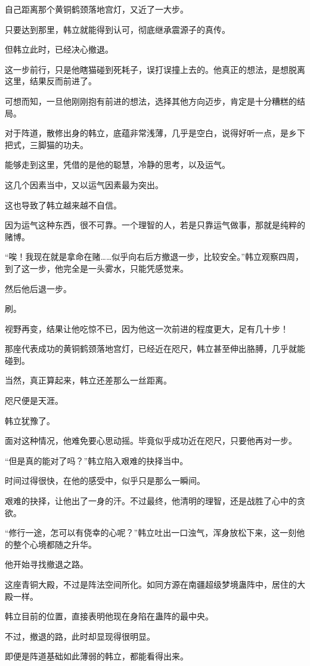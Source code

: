 \begin{this_body}
自己距离那个黄铜鹤颈落地宫灯，又近了一大步。

只要达到那里，韩立就能得到认可，彻底继承震源子的真传。

但韩立此时，已经决心撤退。

这一步前行，只是他瞎猫碰到死耗子，误打误撞上去的。他真正的想法，是想脱离这里，结果反而前进了。

可想而知，一旦他刚刚抱有前进的想法，选择其他方向迈步，肯定是十分糟糕的结局。

对于阵道，散修出身的韩立，底蕴非常浅薄，几乎是空白，说得好听一点，是乡下把式，三脚猫的功夫。

能够走到这里，凭借的是他的聪慧，冷静的思考，以及运气。

这几个因素当中，又以运气因素最为突出。

这也导致了韩立越来越不自信。

因为运气这种东西，很不可靠。一个理智的人，若是只靠运气做事，那就是纯粹的赌博。

“唉！我现在就是拿命在赌……似乎向右后方撤退一步，比较安全。”韩立观察四周，到了这一步，他完全是一头雾水，只能凭感觉来。

然后他后退一步。

刷。

视野再变，结果让他吃惊不已，因为他这一次前进的程度更大，足有几十步！

那座代表成功的黄铜鹤颈落地宫灯，已经近在咫尺，韩立甚至伸出胳膊，几乎就能碰到。

当然，真正算起来，韩立还差那么一丝距离。

咫尺便是天涯。

韩立犹豫了。

面对这种情况，他难免要心思动摇。毕竟似乎成功近在咫尺，只要他再对一步。

“但是真的能对了吗？”韩立陷入艰难的抉择当中。

时间过得很快，在他的感受中，似乎只是那么一瞬间。

艰难的抉择，让他出了一身的汗。不过最终，他清明的理智，还是战胜了心中的贪欲。

“修行一途，怎可以有侥幸的心呢？”韩立吐出一口浊气，浑身放松下来，这一刻他的整个心境都随之升华。

他开始寻找撤退之路。

这座青铜大殿，不过是阵法空间所化。如同方源在南疆超级梦境蛊阵中，居住的大殿一样。

韩立目前的位置，直接表明他现在身陷在蛊阵的最中央。

不过，撤退的路，此时却显现得很明显。

即便是阵道基础如此薄弱的韩立，都能看得出来。


\end{this_body}
